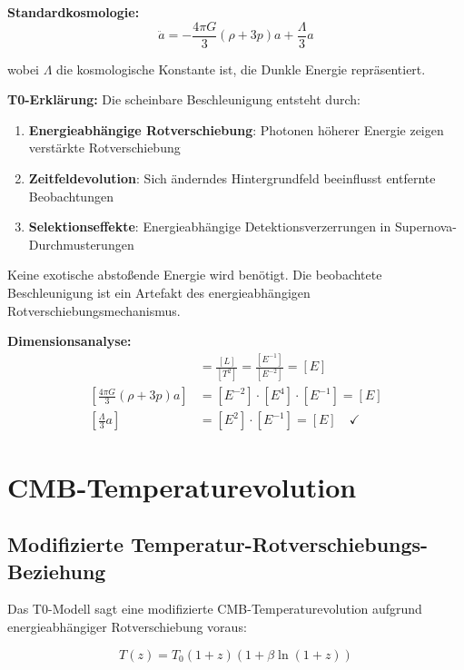 \documentclass[12pt,a4paper]{report}
\begin{document}
	\textbf{Standardkosmologie:}
	\begin{equation}
		\ddot{a} = -\frac{4\pi G}{3}(\rho + 3p)a + \frac{\Lambda}{3}a
	\end{equation}
	
	wobei $\Lambda$ die kosmologische Konstante ist, die Dunkle Energie repräsentiert.
	
	\textbf{T0-Erklärung:}
	Die scheinbare Beschleunigung entsteht durch:
	\begin{enumerate}
		\item \textbf{Energieabhängige Rotverschiebung}: Photonen höherer Energie zeigen verstärkte Rotverschiebung
		\item \textbf{Zeitfeldevolution}: Sich änderndes Hintergrundfeld beeinflusst entfernte Beobachtungen
		\item \textbf{Selektionseffekte}: Energieabhängige Detektionsverzerrungen in Supernova-Durchmusterungen
	\end{enumerate}
	
	Keine exotische abstoßende Energie wird benötigt. Die beobachtete Beschleunigung ist ein Artefakt des energieabhängigen Rotverschiebungsmechanismus.
	
	\textbf{Dimensionsanalyse:}
	\begin{align}
		[\ddot{a}] &= \frac{[L]}{[T^2]} = \frac{[E^{-1}]}{[E^{-2}]} = [E] \\
		\left[\frac{4\pi G}{3}(\rho + 3p)a\right] &= [E^{-2}] \cdot [E^4] \cdot [E^{-1}] = [E] \\
		\left[\frac{\Lambda}{3}a\right] &= [E^2] \cdot [E^{-1}] = [E] \quad \checkmark
	\end{align}
	
	\section{CMB-Temperaturevolution}
	\label{sec:cmb_temperature_evolution}
	
	\subsection{Modifizierte Temperatur-Rotverschiebungs-Beziehung}
	\label{subsec:modified_temperature_redshift}
	
	Das T0-Modell sagt eine modifizierte CMB-Temperaturevolution aufgrund energieabhängiger Rotverschiebung voraus:
	
	\begin{equation}
		\boxed{T(z) = T_0(1+z)\left(1 + \beta \ln(1+z)\right)}
		\label{eq:cmb_temperature_evolution}
	\end{equation}
	
\end{document}
